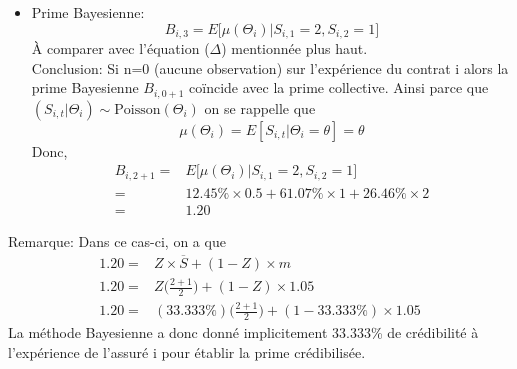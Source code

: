 \begin{itemize}
\begin{align*}
\begin{array}{rl}
      12.45 \% &, \Theta = 0.5 \\
      61.07 \% &, \Theta = 1 \\
      26.46\% &, \Theta = 2 \\
     \end{array}
     \right. \\
\end{align*}
\item[2)] Prime Bayesienne:
\begin{equation}
B_{i,3} = E \Big[ \mu(\Theta_i) | S_{i,1} = 2, S_{i,2} = 1\Big]
\end{equation}
À comparer avec l'équation ($\Delta$) mentionnée plus haut.\\

Conclusion: Si n=0 (aucune observation) sur l'expérience du contrat i alors la prime Bayesienne $B_{i, 0 + 1}$ coïncide avec la prime collective.
Ainsi parce que $(S_{i,t}|\Theta_i) \sim \text{Poisson}(\Theta_i) $ on se rappelle que $$\mu(\Theta_i) = E[S_{i,t}|\Theta_i = \theta] = \theta$$
Donc,
\begin{align*}
B_{i,2+1} =& E \Big[ \mu(\Theta_i) | S_{i,1} = 2, S_{i,2} = 1\Big] \\
=& 12.45 \% \times 0.5 + 61.07\% \times 1 + 26.46 \% \times 2 \\
=& 1.20
\end{align*}
\end{itemize}
Remarque: Dans ce cas-ci, on a que
\begin{align*}
1.20 =& Z \times \overline{S} + (1 - Z) \times m \\
1.20 =& Z \Big(\frac{2 + 1}{2} \Big) + (1 - Z) \times 1.05 \\
1.20 =& (33.333 \%) \Big(\frac{2 + 1}{2} \Big) + (1 - 33.333\%) \times 1.05
\end{align*}
La méthode Bayesienne a donc donné implicitement 33.333\% de crédibilité à l'expérience de l'assuré i pour établir la prime crédibilisée.

